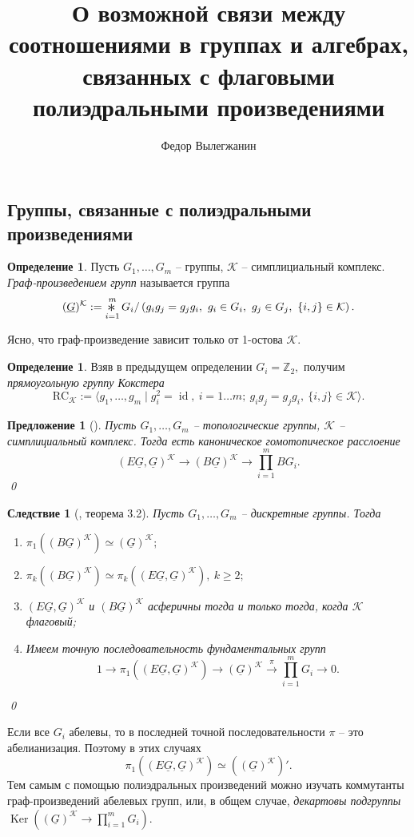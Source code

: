 \documentclass[10pt,a4paper]{article}
\author{Федор Вылегжанин}
\title{О возможной связи между соотношениями в группах и алгебрах, связанных с флаговыми полиэдральными произведениями}
\date{}
\newcommand{\Bigast}{\mathop{\scalebox{1.5}{\raisebox{-0.2ex}{$\ast$}}}}%
\DeclareMathOperator{\id}{id}
\DeclareMathOperator{\Ker}{Ker}
\def\ZZ{\mathbb{Z}}
\def\RC{\mathrm{RC}}
\def\RA{\mathrm{RA}}
\def\K{\mathcal{K}}
\newtheorem{prp}[thm]{Предложение}
\newtheorem{crl}[thm]{Следствие}
\theoremstyle{definition}
\newtheorem{dfn}[thm]{Определение}
\begin{document}
\maketitle



\subsection{Группы, связанные с полиэдральными произведениями}
\begin{dfn}
Пусть $G_1,\dots,G_m$ -- группы, $\K$ -- симплициальный комплекс. \emph{Граф-произведением групп} называется группа
$$(\underline{G})^\K:=\Bigast_{i=1}^m G_i /\left(g_ig_j=g_jg_i,~g_i\in G_i,~g_j\in G_j,~\{i,j\}\in\K\right).$$
\end{dfn}
Ясно, что граф-произведение зависит только от 1-остова $\K.$ 
\begin{dfn} Взяв в предыдущем определении %
$G_i=\ZZ_2,$ получим \emph{прямоугольную группу Кокстера}
$$\RC_\K:=\langle g_1,\dots, g_m\mid g_i^2=\id,~i=1\dots m;~g_ig_j=g_jg_i,~\{i,j\}\in\K\rangle.$$
\end{dfn}

\begin{prp}[\cite{prv,pv}]
Пусть $G_1,\dots,G_m$ -- топологические группы, $\K$ -- симплициальный комплекс. Тогда есть каноническое гомотопическое расслоение
$$(E\underline{G},\underline{G})^\K\to(B\underline{G})^\K\to\prod_{i=1}^mBG_i.$$\qed
\end{prp}
\begin{crl}[\cite{pv}, теорема 3.2]
Пусть $G_1,\dots,G_m$ -- дискретные группы. Тогда
\begin{enumerate}
\item $\pi_1((B\underline{G})^\K)\simeq (\underline{G})^\K;$
\item $\pi_k((B\underline{G})^\K)\simeq\pi_k((E\underline{G},\underline{G})^\K),~k\geq 2;$ 
\item $(E\underline{G},\underline{G})^\K$ и $(B\underline{G})^\K$ асферичны тогда и только тогда, когда $\K$ флаговый;
\item Имеем точную последовательность фундаментальных групп
$$1\to\pi_1((E\underline{G},\underline{G})^\K)\to (\underline{G})^\K\overset{\pi}{\longrightarrow}\prod_{i=1}^m G_i\to 0.$$
\end{enumerate}\qed
\end{crl}
Если все $G_i$ абелевы, то в последней точной последовательности $\pi$ -- это абелианизация. Поэтому в этих случаях 
$$\pi_1((E\underline{G},\underline{G})^\K)\simeq ((\underline{G})^\K)'.$$
Тем самым с помощью полиэдральных произведений можно изучать коммутанты граф-произведений абелевых групп, или, в общем случае, \emph{декартовы подгруппы} $\Ker((\underline{G})^\K\to\prod_{i=1}^m G_i)$.
\end{document}
